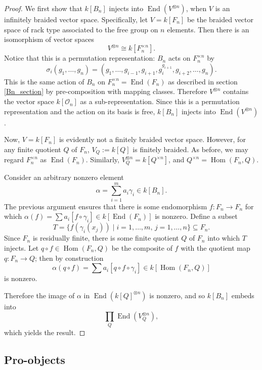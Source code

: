 \documentclass[12pt]{article}
\DeclareMathOperator{\Hom}{Hom}
\DeclareMathOperator{\End}{End}
\newcommand{\OO}{\mathcal{O}}
\theoremstyle{plain}
\theoremstyle{definition}
\theoremstyle{remark}
\begin{document}
\begin{proof}

We first show that $k[B_n]$ injects into $\End(V^{\otimes n})$, when $V$ is an infinitely braided vector space.  Specifically, let $V = k[F_n]$ be the braided vector space of rack type associated to the free group on $n$ elements.  Then there is an isomorphism of vector spaces
%
$$V^{\otimes n} \cong k[F_n^{\times n}].$$
%
Notice that this is a permutation representation: $B_n$ acts on $F_n^{\times n}$ by
%
$$\sigma_i(g_1, \dots, g_n) = (g_1, \dots, g_{i-1}, g_{i+1}, g_i^{g_{i+1}}, g_{i+2}, \dots, g_n).$$
%
This is the same action of $B_n$ on $F_n^{\times n} = \End(F_n)$ as described in section \ref{Bn_section} by pre-composition with mapping classes.  Therefore $V^{\otimes n}$ contains the vector space $k[\OO_n]$ as a sub-representation.  Since this is a permutation representation and the action on its basis is free, $k[B_n]$ injects into $\End(V^{\otimes n})$.

Now, $V = k[F_n]$ is evidently not a finitely braided vector space.  However, for any finite quotient $Q$ of $F_n$, $V_Q := k[Q]$ is finitely braided.  As before, we may regard $F_n^{\times n}$ as $\End(F_n)$.  Similarly, $V_Q^{\otimes n} = k[Q^{\times n}]$, and $Q^{\times n} = \Hom(F_n, Q)$.

Consider an arbitrary nonzero element 
%
$$\alpha = \sum_{i=1}^m a_i \gamma_i \in k[B_n].$$ 
%
The previous argument ensures that there is some endomorphism $f: F_n \to F_n$ for which $\alpha(f) = \sum a_i [f \circ \gamma_i] \in k[\End(F_n)]$ is nonzero.  Define a subset 
%
$$T = \{f(\gamma_i(x_j))\; | \; i=1, \dots, m, \, j = 1, \dots,n\} \subseteq F_n.$$  
%
Since $F_n$ is residually finite, there is some finite quotient $Q$ of $F_n$ into which $T$ injects.  Let $q \circ f \in \Hom(F_n, Q)$ be the composite of $f$ with the quotient map $q: F_n \to Q$; then by construction 
%
$$\alpha(q \circ f) = \sum a_i [q \circ f \circ \gamma_i] \in k[\Hom(F_n, Q)]$$
%
is nonzero.

Therefore the image of $\alpha$ in $\End(k[Q]^{\otimes n})$ is nonzero, and so $k[B_n]$ embeds into 
%
$$\prod_Q \End(V_Q^{\otimes n}),$$
%
which yields the result.

\end{proof}


\subsection{Pro-objects} \label{pro-section}
\end{document}
